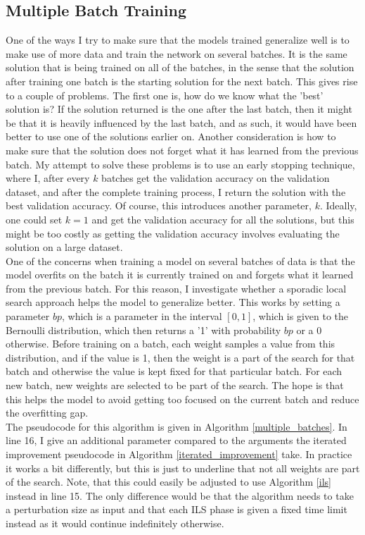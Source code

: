 \subsection{Multiple Batch Training}

One of the ways I try to make sure that the models trained generalize well is to make use of more data and train the network on several batches. It is the same solution that is being trained on all of the batches, in the sense that the solution after training one batch is the starting solution for the next batch. This gives rise to a couple of problems. The first one is, how do we know what the 'best' solution is? If the solution returned is the one after the last batch, then it might be that it is heavily influenced by the last batch, and as such, it would have been better to use one of the solutions earlier on. Another consideration is how to make sure that the solution does not forget what it has learned from the previous batch. My attempt to solve these problems is to use an early stopping technique, where I, after every $k$ batches get the validation accuracy on the validation dataset, and after the complete training process, I return the solution with the best validation accuracy. Of course, this introduces another parameter, $k$. Ideally, one could set $k=1$ and get the validation accuracy for all the solutions, but this might be too costly as getting the validation accuracy involves evaluating the solution on a large dataset. \\

\noindent One of the concerns when training a model on several batches of data is that the model overfits on the batch it is currently trained on and forgets what it learned from the previous batch. For this reason, I investigate whether a sporadic local search approach helps the model to generalize better. This works by setting a parameter $bp$, which is a parameter in the interval $[0,1]$, which is given to the Bernoulli distribution, which then returns a '1' with probability $bp$ or a 0 otherwise. Before training on a batch, each weight samples a value from this distribution, and if the value is 1, then the weight is a part of the search for that batch and otherwise the value is kept fixed for that particular batch. For each new batch, new weights are selected to be part of the search. The hope is that this helps the model to avoid getting too focused on the current batch and reduce the overfitting gap. \\

\noindent The pseudocode for this algorithm is given in Algorithm \ref{multiple_batches}. In line 16, I give an additional parameter compared to the arguments the iterated improvement pseudocode in Algorithm \ref{iterated_improvement} take. In practice it works a bit differently, but this is just to underline that not all weights are part of the search. Note, that this could easily be adjusted to use Algorithm \ref{ils} instead in line 15. The only difference would be that the algorithm needs to take a perturbation size as input and that each ILS phase is given a fixed time limit instead as it would continue indefinitely otherwise. 

